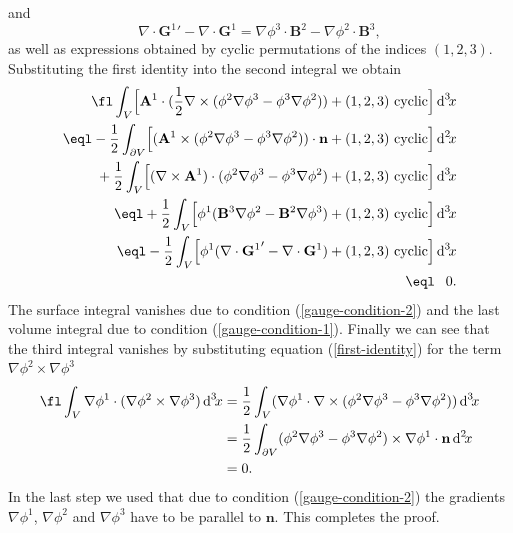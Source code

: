 \documentclass[10pt]{iopart}
\def \d{\mbox{d}}
\def \dxx{\,\d^{2}\!x}
\def \dxxx{\,\d^{3}\!x}
\def \text{\mbox}
\def \Eq{equation }
\def \p{{\partial}}
\def \bA{{\mathbf{A}}}
\def \bB{{\mathbf{B}}}
\def \bG{{\mathbf{G}}}
\def \bn{{\mathbf{n}}}
\begin{document}
and \[ \nabla\cdot{\bG^1}'-\nabla\cdot\bG^1 = 
            \nabla\phi^3\cdot\bB^2 -\nabla\phi^2\cdot\bB^3, \]
as well as expressions obtained by cyclic 
permutations of the indices $(1,2,3)$.
Substituting the first identity into the second integral we obtain
\begin{eqnarray}
 \fl
 \int_V\Bigl[
   \bA^1\cdot(\frac{1}{2}\nabla\times(\phi^2\nabla\phi^3-\phi^3\nabla\phi^2))
            + (1,2,3)~\text{cyclic}\Bigr]\dxxx \nonumber \\
   \eql-\frac{1}{2}\int_{\p V} \Bigl[
    (\bA^1 \times (\phi^2\nabla\phi^3-\phi^3\nabla\phi^2))\cdot\bn
      + (1,2,3)~\text{cyclic} \Bigr]\dxx\nonumber\\ 
    \vphantom{-}+\frac{1}{2}\int_V \Bigl[ (\nabla \times\bA^1)\cdot
    (\phi^2\nabla\phi^3-\phi^3\nabla\phi^2)+(1,2,3)~\text{cyclic}\Bigr]\dxxx\nonumber\\
   \eql +\frac{1}{2}\int_V \Bigl[\phi^1(\bB^3\nabla\phi^2-\bB^2\nabla\phi^3)
                                           +(1,2,3)~\text{cyclic}\Bigr]\dxxx\nonumber\\
 \eql - \frac{1}{2}\int_V \Bigl[\phi^1(\nabla\cdot{\bG^1}'-\nabla\cdot\bG^1)
                                           +(1,2,3)~\text{cyclic}\Bigr]\dxxx\nonumber\\
 \eql \phantom{-}0.\nonumber
\end{eqnarray}
The surface integral vanishes due to condition (\ref{gauge-condition-2})
and the last volume integral due to condition (\ref{gauge-condition-1}).
Finally we can see that the third integral vanishes by
substituting \Eq (\ref{first-identity}) for the term 
$\nabla\phi^2\times\nabla\phi^3$
\begin{eqnarray}
  \fl
   \int_V \nabla \phi^1\cdot(\nabla\phi^2\times\nabla\phi^3)\dxxx
&= \frac{1}{2} 
   \int_V(\nabla \phi^1\cdot\nabla\times(\phi^2\nabla\phi^3-\phi^3\nabla\phi^2)
   )\dxxx\nonumber\\
&= \frac{1}{2}
   \int_{\p V}
   ( \phi^2 \nabla \phi^3-\phi^3\nabla\phi^2)
   \times
   \nabla\phi^1
   \cdot\bn\dxx\nonumber\\
&= 0.\nonumber
\end{eqnarray}
In the last step we used that due to condition
(\ref{gauge-condition-2}) the gradients $\nabla \phi^1$, $ \nabla \phi^2$ 
and $ \nabla \phi^3$ have to be parallel to $\bn$.
This completes the proof.
\end{document}
